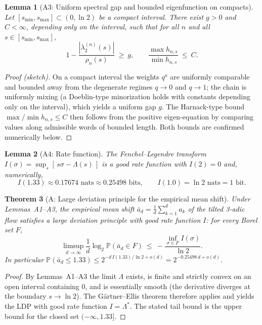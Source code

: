 \documentclass[12pt,a4paper]{article}
\newtheorem{theorem}{Theorem}[section]
\newtheorem{lemma}[theorem]{Lemma}
\begin{document}
\begin{lemma}[A3: Uniform spectral gap and bounded eigenfunction on compacts]
Let $[s_{\min},s_{\max}]\subset(0,\ln2)$ be a compact interval. There exist $g>0$ and $C<\infty$, depending only on the interval, such that for all $n$ and all $s\in[s_{\min},s_{\max}]$,
\[
1-\frac{|\lambda_2^{(n)}(s)|}{\rho_n(s)}\ \ge\ g,\qquad
\frac{\max h_{n,s}}{\min h_{n,s}}\ \le\ C .
\]
\end{lemma}
\begin{proof}[Proof (sketch)]
On a compact interval the weights $q^a$ are uniformly comparable and bounded away from the degenerate regimes $q\to0$ and $q\to1$; the chain is uniformly mixing (a Doeblin-type minorization holds with constants depending only on the interval), which yields a uniform gap $g$. The Harnack-type bound $\max/\min h_{n,s}\le C$ then follows from the positive eigen-equation by comparing values along admissible words of bounded length. Both bounds are confirmed numerically below.
\end{proof}

\begin{lemma}[A4: Rate function]
The Fenchel--Legendre transform $I(\sigma)=\sup_{s}[\,s\sigma-\Lambda(s)\,]$ is a good rate function with $I(2)=0$ and, numerically,
\[
I(1.33)\approx0.17674\text{ nats}\approx0.25498\text{ bits},\qquad I(1.0)=\ln 2\text{ nats}=1\text{ bit}.
\]
\end{lemma}

\begin{theorem}[A: Large deviation principle for the empirical mean shift]
\label{thm:step_a_ldp}
Under Lemmas~A1--A3, the empirical mean shift $\bar a_d=\frac1d\sum_{k=1}^d a_k$ of the tilted 3-adic flow satisfies a large deviation principle with good rate function $I$: for every Borel set $F$,
\[
\limsup_{d\to\infty}\frac1d\log_2\mathbb P(\bar a_d\in F)\ \le\ -\frac{\inf_{\sigma\in F} I(\sigma)}{\ln 2} .
\]
In particular $\mathbb P(\bar a_d\le1.33)\le 2^{-d\,I(1.33)/\ln 2+o(d)}=2^{-0.25498\,d+o(d)}$.
\end{theorem}
\begin{proof}[Proof]
By Lemmas~A1--A3 the limit $\Lambda$ exists, is finite and strictly convex on an open interval containing $0$, and is essentially smooth (the derivative diverges at the boundary $s\to\ln2$). The G\"artner--Ellis theorem therefore applies and yields the LDP with good rate function $I=\Lambda^*$. The stated tail bound is the upper bound for the closed set $(-\infty,1.33]$.
\end{proof}
\end{document}

